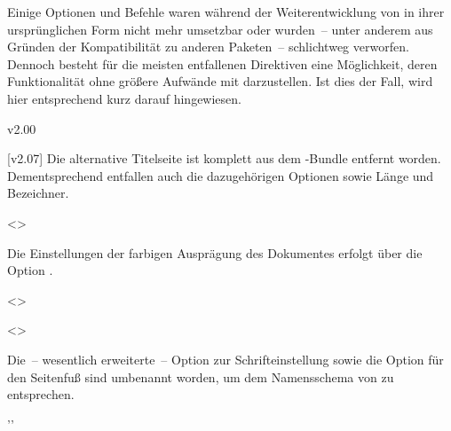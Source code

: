 Einige Optionen und Befehle waren während der Weiterentwicklung von \TUDScript
in ihrer ursprünglichen Form nicht mehr umsetzbar oder wurden~-- unter anderem 
aus Gründen der Kompatibilität zu anderen Paketen~-- schlichtweg verworfen. 
Dennoch besteht für die meisten entfallenen Direktiven eine Möglichkeit, deren 
Funktionalität ohne größere Aufwände mit \vTUDScript*{\TUDScript} darzustellen. 
Ist dies der Fall, wird hier entsprechend kurz darauf hingewiesen.



\begin{Cessations}{v2.00}
\begin{Cessation}
  [\Option{cd=\PMisc}]
  {}
\begin{Cessation}
  [\Option{cdtitle=\PMisc}]
  {}
\begin{Cessation}
  {}
\begin{Cessation}
  {}
\printdeclarationlist

[v2.07]%
Die alternative Titelseite ist komplett aus dem \TUDScript-Bundle entfernt 
worden. Dementsprechend entfallen auch die dazugehörigen Optionen sowie Länge 
und Bezeichner.
\end{Cessation}
\end{Cessation}
\end{Cessation}
\end{Cessation}

\begin{Cessation}
  {}
  <>
\printdeclarationlist

Die Einstellungen der farbigen Ausprägung des Dokumentes erfolgt über die 
Option .
\end{Cessation}

\begin{Cessation}
  {}
  <>
\begin{Cessation}
  {}
  <>
\printdeclarationlist

Die~-- wesentlich erweiterte~-- Option zur Schrifteinstellung sowie die Option 
für den Seitenfuß sind umbenannt worden, um dem Namensschema von \TUDScript zu 
entsprechen.
\end{Cessation}
\end{Cessation}

\begin{Cessation}
  {}
  ''
\printdeclarationlist


\end{Cessation}
\end{Cessations}
